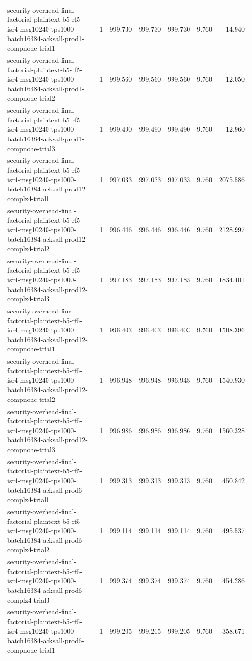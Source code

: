 \begin{tabular}{lrrrrrr}
security-overhead-final-factorial-plaintext-b5-rf5-isr4-msg10240-tps1000-batch16384-acksall-prod1-compnone-trial1 & 1 & 999.730 & 999.730 & 999.730 & 9.760 & 14.940 \\
security-overhead-final-factorial-plaintext-b5-rf5-isr4-msg10240-tps1000-batch16384-acksall-prod1-compnone-trial2 & 1 & 999.560 & 999.560 & 999.560 & 9.760 & 12.050 \\
security-overhead-final-factorial-plaintext-b5-rf5-isr4-msg10240-tps1000-batch16384-acksall-prod1-compnone-trial3 & 1 & 999.490 & 999.490 & 999.490 & 9.760 & 12.960 \\
security-overhead-final-factorial-plaintext-b5-rf5-isr4-msg10240-tps1000-batch16384-acksall-prod12-complz4-trial1 & 1 & 997.033 & 997.033 & 997.033 & 9.760 & 2075.586 \\
security-overhead-final-factorial-plaintext-b5-rf5-isr4-msg10240-tps1000-batch16384-acksall-prod12-complz4-trial2 & 1 & 996.446 & 996.446 & 996.446 & 9.760 & 2128.997 \\
security-overhead-final-factorial-plaintext-b5-rf5-isr4-msg10240-tps1000-batch16384-acksall-prod12-complz4-trial3 & 1 & 997.183 & 997.183 & 997.183 & 9.760 & 1834.401 \\
security-overhead-final-factorial-plaintext-b5-rf5-isr4-msg10240-tps1000-batch16384-acksall-prod12-compnone-trial1 & 1 & 996.403 & 996.403 & 996.403 & 9.760 & 1508.396 \\
security-overhead-final-factorial-plaintext-b5-rf5-isr4-msg10240-tps1000-batch16384-acksall-prod12-compnone-trial2 & 1 & 996.948 & 996.948 & 996.948 & 9.760 & 1540.930 \\
security-overhead-final-factorial-plaintext-b5-rf5-isr4-msg10240-tps1000-batch16384-acksall-prod12-compnone-trial3 & 1 & 996.986 & 996.986 & 996.986 & 9.760 & 1560.328 \\
security-overhead-final-factorial-plaintext-b5-rf5-isr4-msg10240-tps1000-batch16384-acksall-prod6-complz4-trial1 & 1 & 999.313 & 999.313 & 999.313 & 9.760 & 450.842 \\
security-overhead-final-factorial-plaintext-b5-rf5-isr4-msg10240-tps1000-batch16384-acksall-prod6-complz4-trial2 & 1 & 999.114 & 999.114 & 999.114 & 9.760 & 495.537 \\
security-overhead-final-factorial-plaintext-b5-rf5-isr4-msg10240-tps1000-batch16384-acksall-prod6-complz4-trial3 & 1 & 999.374 & 999.374 & 999.374 & 9.760 & 454.286 \\
security-overhead-final-factorial-plaintext-b5-rf5-isr4-msg10240-tps1000-batch16384-acksall-prod6-compnone-trial1 & 1 & 999.205 & 999.205 & 999.205 & 9.760 & 358.671 \\

\end{tabular}
